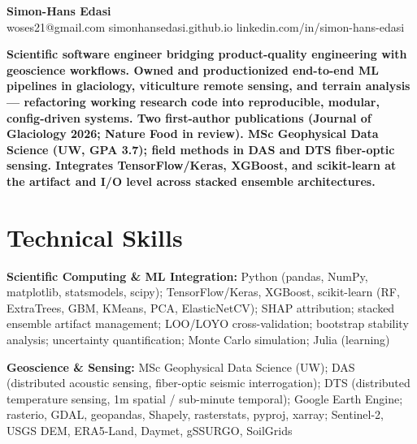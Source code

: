 \documentclass[11pt,a4paper]{article}
\begin{document}
\noindent{}

\begin{center}
    {\LARGE \textbf{Simon-Hans Edasi}} \\[6pt]
    woses21@gmail.com \hfill \textbar \hfill
    simonhansedasi.github.io \hfill \textbar \hfill
    linkedin.com/in/simon-hans-edasi
\end{center}

\vspace{0.3cm}

\noindent
\textbf{Scientific software engineer bridging product-quality engineering with geoscience workflows. Owned and productionized end-to-end ML pipelines in glaciology, viticulture remote sensing, and terrain analysis --- refactoring working research code into reproducible, modular, config-driven systems. Two first-author publications (Journal of Glaciology 2026; Nature Food in review). MSc Geophysical Data Science (UW, GPA 3.7); field methods in DAS and DTS fiber-optic sensing. Integrates TensorFlow/Keras, XGBoost, and scikit-learn at the artifact and I/O level across stacked ensemble architectures.}

\section*{Technical Skills}

\noindent
\textbf{Scientific Computing \& ML Integration:} Python (pandas, NumPy, matplotlib, statsmodels, scipy); TensorFlow/Keras, XGBoost, scikit-learn (RF, ExtraTrees, GBM, KMeans, PCA, ElasticNetCV); SHAP attribution; stacked ensemble artifact management; LOO/LOYO cross-validation; bootstrap stability analysis; uncertainty quantification; Monte Carlo simulation; Julia (learning)

\noindent
\textbf{Geoscience \& Sensing:} MSc Geophysical Data Science (UW); DAS (distributed acoustic sensing, fiber-optic seismic interrogation); DTS (distributed temperature sensing, 1m spatial / sub-minute temporal); Google Earth Engine; rasterio, GDAL, geopandas, Shapely, rasterstats, pyproj, xarray; Sentinel-2, USGS DEM, ERA5-Land, Daymet, gSSURGO, SoilGrids
\end{document}
